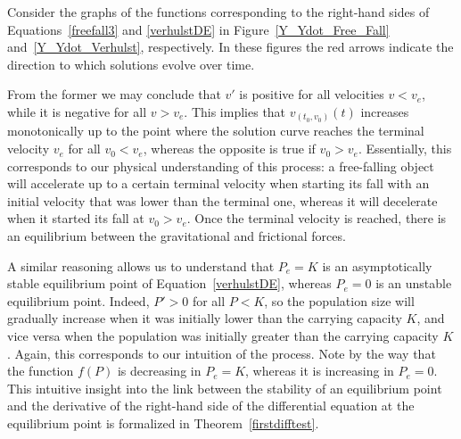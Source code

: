 \begin{example}
Consider the graphs of the functions corresponding to the right-hand sides of Equations~\eqref{freefall3} and \eqref{verhulstDE} in Figure~\ref{Y_Ydot_Free_Fall} and~\ref{Y_Ydot_Verhulst}, respectively. In these figures the red arrows indicate the direction to which solutions evolve over time.

From the former we may conclude that $v'$ is positive for all velocities $v<v_e$, while it is negative for all $v>v_e$. This implies that $v_{(t_0,v_0)}(t)$ increases monotonically up to the point where the solution curve reaches the terminal velocity $v_e$ for all $v_0<v_e$, whereas the opposite is true if $v_0>v_e$. Essentially, this corresponds to our physical understanding of this process: a free-falling object will accelerate up to a certain terminal velocity when starting its fall with an initial velocity that was lower than the terminal one, whereas it will decelerate when it started its fall at $v_0>v_e$.  Once the terminal velocity is reached, there is an equilibrium between the gravitational and frictional forces. 

A similar reasoning allows us to understand that $P_e=K$ is an asymptotically stable equilibrium point of Equation~\eqref{verhulstDE}, whereas $P_e=0$ is an unstable equilibrium point. Indeed, $P'>0$ for all $P<K$, so the population size will gradually increase when it was initially lower than the carrying capacity  $K$, and vice versa when the population was initially greater than the carrying capacity $K$. Again, this corresponds to our intuition of the process. Note by the way that the function $f(P)$ is decreasing in $P_e=K$, whereas it is increasing in $P_e=0$. This intuitive insight into the link between the stability of an equilibrium point and the derivative of the right-hand side of the differential equation at the equilibrium point is formalized in Theorem~\ref{firstdifftest}. 


\end{example}
